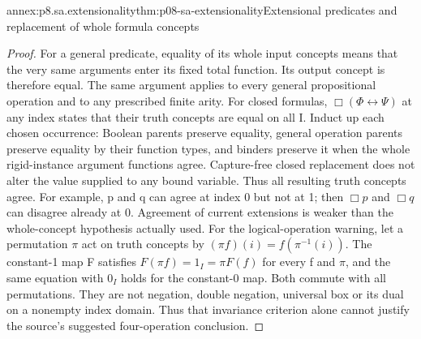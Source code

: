 \begin{annexitem}{annex:p8.sa.extensionality}{thm:p08-sa-extensionality}{Extensional predicates and replacement of whole formula concepts}
\begin{proof}
For a general predicate, equality of its whole input concepts
means that the very same arguments enter its fixed total function.
Its output concept is therefore equal. The same argument applies
to every general propositional operation and to any prescribed
finite arity. For closed formulas,
\(\Box(\Phi\leftrightarrow\Psi)\) at any index states
that their truth concepts are equal on all I. Induct up each
chosen occurrence: Boolean parents preserve equality, general
operation parents preserve equality by their function types,
and binders preserve it when the whole rigid-instance argument
functions agree. Capture-free closed replacement does not alter
the value supplied to any bound variable. Thus all resulting
truth concepts agree. For example, p and q can agree at index 0
but not at 1; then \(\Box p\) and \(\Box q\) can disagree
already at 0. Agreement of current extensions is weaker than
the whole-concept hypothesis actually used.
For the logical-operation warning, let a permutation \(\pi\) act
on truth concepts by \((\pi f)(i)=f(\pi^{-1}(i))\).
The constant-1 map F satisfies \(F(\pi f)=1_I=\pi F(f)\)
for every f and \(\pi\), and the same equation with \(0_I\)
holds for the constant-0 map. Both commute with all permutations.
They are not negation, double negation, universal box or its dual
on a nonempty index domain. Thus that invariance criterion alone
cannot justify the source's suggested four-operation conclusion.
\end{proof}
\end{annexitem}

